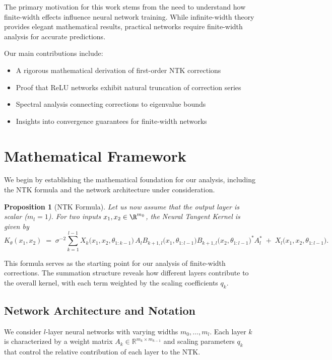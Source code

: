 \documentclass[11pt,a4paper]{article}
\newtheorem{proposition}[theorem]{Proposition}
\theoremstyle{definition}
\begin{document}
The primary motivation for this work stems from the need to understand how finite-width effects influence neural network training. While infinite-width theory provides elegant mathematical results, practical networks require finite-width analysis for accurate predictions.

Our main contributions include:
\begin{itemize}
\item A rigorous mathematical derivation of first-order NTK corrections
\item Proof that ReLU networks exhibit natural truncation of correction series
\item Spectral analysis connecting corrections to eigenvalue bounds
\item Insights into convergence guarantees for finite-width networks
\end{itemize}

\newpage

\section{Mathematical Framework}

We begin by establishing the mathematical foundation for our analysis, including the NTK formula and the network architecture under consideration.
\begin{proposition}[NTK Formula]\label{prop:ntk}
Let us now assume that the output layer is scalar ($m_l = 1$). For two inputs $x_1,x_2 \in \R^{m_0}$, the Neural Tangent Kernel is given by
\begin{equation}\label{eq:ntk_formula}
K_{\theta}(x_1,x_2) \;=\;\sigma^{-2}\sum_{k=1}^{l-1} X_k\bigl(x_1,x_2,\theta_{1:k-1}\bigr)\,A_l B_{k+1,l}\bigl(x_1,\theta_{1:l-1}\bigr)B_{k+1,l}\bigl(x_2,\theta_{1:l-1}\bigr)^{*}A_l^{*}
\; +\; X_l\bigl(x_1,x_2,\theta_{1:l-1}\bigr).
\end{equation}
\end{proposition}

This formula serves as the starting point for our analysis of finite-width corrections. The summation structure reveals how different layers contribute to the overall kernel, with each term weighted by the scaling coefficients $q_k$.

\subsection{Network Architecture and Notation}

We consider $l$-layer neural networks with varying widths $m_0, \ldots, m_l$. Each layer $k$ is characterized by a weight matrix $A_k \in \mathbb{R}^{m_k \times m_{k-1}}$ and scaling parameters $q_k$ that control the relative contribution of each layer to the NTK.
\end{document}

